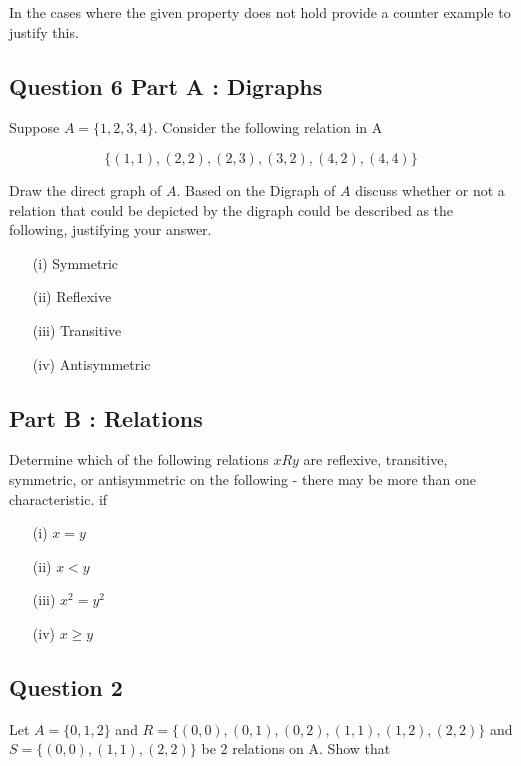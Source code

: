 \documentclass[]{report}
\begin{document}
In the cases where the given property does not hold provide a counter example to justify this.


\subsection*{Question 6 Part A : Digraphs}

Suppose $A = $$\{1,2,3,4\}$. Consider the following relation in A

\[ \{  (1,1),(2,2),(2,3),(3,2),(4,2),(4,4)\} \]

Draw the direct graph of $A$. Based on the Digraph of $A$ discuss whether or not a relation that could be depicted by the digraph could be described as the following, justifying your answer.


\begin{itemize}
	\item[(i)] Symmetric
	\item[(ii)] Reflexive 
	\item[(iii)] Transitive
	\item[(iv)] Antisymmetric
\end{itemize}

\subsection*{Part B : Relations}
Determine which of the following relations $ x R y$ are reflexive, transitive, symmetric, or antisymmetric on the following - there may be more than one characteristic.  if

\begin{itemize} 
	\item[(i)] $x = y$
	\item[(ii)] $x < y$
	\item[(iii)] $x^2 = y^2$
	\item[(iv)] $x \geq y$
\end{itemize}
\subsection*{Question 2}


Let $A=\{0,1,2\}$ and $R=\{ (0,0),(0,1),(0,2),(1,1), (1,2), (2,2)\}$
and $S=\{(0,0),(1,1),(2,2)\}$ be 2 relations on A. Show that
\end{document}
